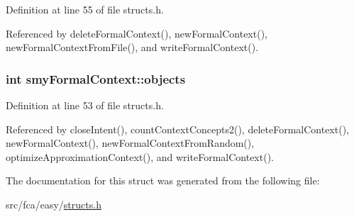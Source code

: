 \-Definition at line 55 of file structs.\-h.



\-Referenced by delete\-Formal\-Context(), new\-Formal\-Context(), new\-Formal\-Context\-From\-File(), and write\-Formal\-Context().

\hypertarget{structsmyFormalContext_ab6e220297887bc2af0e612c94132ceb3}{
\subsubsection[{objects}]{\setlength{\rightskip}{0pt plus 5cm}int {\bf smy\-Formal\-Context\-::objects}}}\label{structsmyFormalContext_ab6e220297887bc2af0e612c94132ceb3}


\-Definition at line 53 of file structs.\-h.



\-Referenced by close\-Intent(), count\-Context\-Concepts2(), delete\-Formal\-Context(), new\-Formal\-Context(), new\-Formal\-Context\-From\-Random(), optimize\-Approximation\-Context(), and write\-Formal\-Context().



\-The documentation for this struct was generated from the following file\-:\begin{DoxyCompactItemize}
\item 
src/fca/easy/\hyperlink{easy_2structs_8h}{structs.\-h}\end{DoxyCompactItemize}
